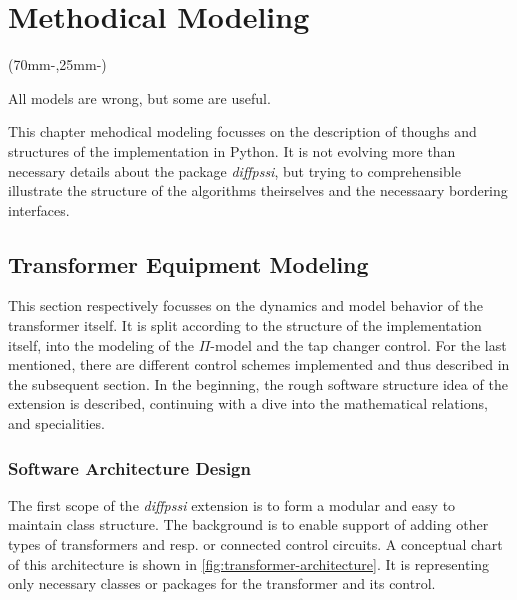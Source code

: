 
\chapter{Methodical Modeling}
\label{chap:methodical-modeling}

\begin{textblock*}{.7\textwidth}(70mm-\offset,25mm-\offset)
        \begin{fquote}
            All models are wrong, but some are useful.
        \end{fquote}
\end{textblock*}

This chapter mehodical modeling focusses on the description of thoughs and structures of the implementation in Python.
It is not evolving more than necessary details about the package {\itshape diffpssi}, but trying to comprehensible illustrate the structure of the algorithms theirselves and the necessaary bordering interfaces.

\section{Transformer Equipment Modeling}
\label{sec:transformer-modeling}

This section respectively focusses on the dynamics and model behavior of the transformer itself.
It is split according to the structure of the implementation itself, into the modeling of the $\Pi$-model and the tap changer control.
For the last mentioned, there are different control schemes implemented and thus described in the subsequent section.
In the beginning, the rough software structure idea of the extension is described, continuing with a dive into the mathematical relations, and specialities.  

\subsection{Software Architecture Design}
\label{sec:modeling-architecture}

The first scope of the \textit{diffpssi} extension is to form a modular and easy to maintain class structure. 
The background is to enable support of adding other types of transformers and resp. or connected control circuits.
A conceptual chart of this architecture is shown in \autoref{fig:transformer-architecture}.
It is representing only necessary classes or packages for the transformer and its control.

